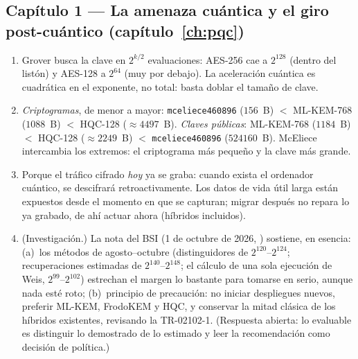 
\subsection*{Capítulo 1 --- La amenaza cuántica y el giro
post-cuántico (capítulo~\ref{ch:pqc})}

\begin{enumerate}[leftmargin=1.9em,itemsep=4pt]
  \item Grover busca la clave en $2^{k/2}$ evaluaciones: AES-256
        cae a $2^{128}$ (dentro del listón) y AES-128 a $2^{64}$
        (muy por debajo). La aceleración cuántica es cuadrática en el
        exponente, no total: basta doblar el tamaño de clave.
  \item \emph{Criptogramas}, de menor a mayor: \texttt{mceliece460896}
        ($156$~B) $<$ ML-KEM-768 ($1088$~B) $<$ HQC-128
        ($\approx4497$~B). \emph{Claves públicas}: ML-KEM-768
        ($1184$~B) $<$ HQC-128 ($\approx2249$~B) $<$
        \texttt{mceliece460896} ($\num{524160}$~B). McEliece
        intercambia los extremos: el criptograma más pequeño y la
        clave más grande.
  \item Porque el tráfico cifrado \emph{hoy} ya se graba: cuando
        exista el ordenador cuántico, se descifrará retroactivamente.
        Los datos de vida útil larga están expuestos desde el momento
        en que se capturan; migrar después no repara lo ya grabado, de
        ahí actuar ahora (híbridos incluidos).
  \item \textnormal{(}Investigación.\textnormal{)} La nota del BSI
        (1 de octubre de 2026, \cite{bsi2026}) sostiene, en esencia:
        (a)~los métodos de agosto--octubre (distinguidores de
        $2^{120}$--$2^{124}$; recuperaciones estimadas de
        $2^{140}$--$2^{148}$; el cálculo de una sola ejecución de
        Weis, $2^{99}$--$2^{102}$) estrechan el margen lo bastante
        para tomarse en serio, aunque nada esté roto; (b)~principio de
        precaución: no iniciar despliegues nuevos, preferir ML-KEM,
        FrodoKEM y HQC, y conservar la mitad clásica de los híbridos
        existentes, revisando la TR-02102-1. (Respuesta abierta: lo
        evaluable es distinguir lo demostrado de lo estimado y leer
        la recomendación como decisión de política.)
\end{enumerate}

